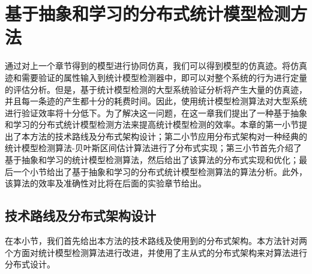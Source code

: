 \chapter{基于抽象和学习的分布式统计模型检测方法}
\label{ch4}
通过对上一个章节得到的模型进行协同仿真，我们可以得到模型的仿真迹。将仿真迹和需要验证的属性输入到统计模型检测器中，即可以对整个系统的行为进行定量的评估分析。但是，基于统计模型检测的大型系统验证分析将产生大量的仿真迹，并且每一条迹的产生都十分的耗费时间。因此，使用统计模型检测算法对大型系统进行验证效率将十分低下。为了解决这一问题，在这一章我们提出了一种基于抽象和学习的分布式统计模型检测方法来提高统计模型检测的效率。本章的第一小节提出了本方法的技术路线及分布式架构设计；第二小节应用分布式架构对一种经典的统计模型检测算法-贝叶斯区间估计算法\cite{zuliani2013bayesian}进行了分布式实现；第三小节首先介绍了基于抽象和学习的统计模型检测算法，然后给出了该算法的分布式实现和优化；最后一个小节给出了基于抽象和学习的分布式统计模型检测算法的算法分析。此外，该算法的效率及准确性对比将在后面的实验章节给出。
\section{技术路线及分布式架构设计}
在本小节，我们首先给出本方法的技术路线及使用到的分布式架构。本方法针对两个方面对统计模型检测算法进行改进，并使用了主从式的分布式架构来对算法进行分布式设计。
